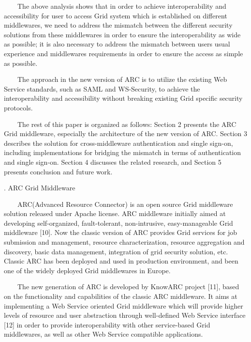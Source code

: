 \documentclass{article}
\begin{document}
\ \ \ \ The above analysis shows that in order to achieve
interoperability and accessibility for user to access Grid system which
is established on different middlewares, we need to address the
mismatch between the different security solutions from these
middlewares in order to ensure the interoperability as wide as
possible; it is also necessary to address the mismatch between
users{\textquotesingle} usual experience and
middleware{\textquotesingle}s requirements in order to ensure the
access as simple as possible.

\ \ \ \ The approach in the new version of ARC is to utilize the
existing Web Service standards, such as SAML and WS-Security, to
achieve the interoperability and accessibility without breaking
existing Grid specific security protocols.

\ \ \ \ The rest of this paper is organized as follows: Section 2
presents the ARC Grid middleware, especially the architecture of the
new version of ARC. Section 3 describes the solution for
cross-middleware authentication and single sign-on, including
implementations for bridging the mismatch in terms of authentication
and single sign-on. Section 4 discusses the related research, and
Section 5 presents conclusion and future work.

{. ARC Grid Middleware 
\par}

\ \ \ \ ARC(Advanced Resource Connector) is an open source Grid
middleware solution released under Apache license. ARC middleware
initially aimed at developing self-organized, fault-tolerant,
non-intrusive, easy-manageable Grid middleware [10]. Now the classic
version of ARC provides Grid services for job submission and
management, resource characterization, resource aggregation and
discovery, basic data management, integration of grid security
solution, etc. Classic ARC has been deployed and used in production
environment, and been one of the widely deployed Grid middlewares in
Europe.

\ \ \ \ The new generation of ARC is developed by KnowARC project [11],
based on the functionality and capabilities of the classic ARC
middleware. It aims at implementing a Web Service oriented Grid
middleware which will provide higher levels of resource and user
abstraction through well-defined Web Service interface [12] in order to
provide interoperability with other service-based Grid middlewares, as
well as other Web Service compatible applications.
\end{document}

